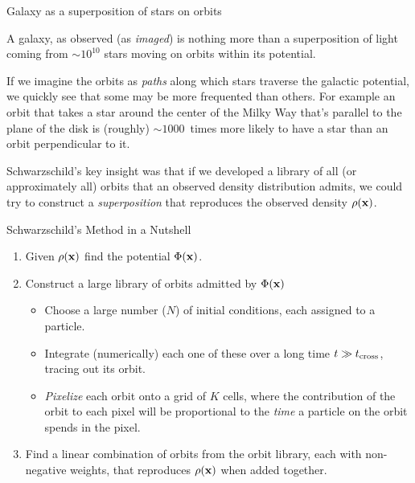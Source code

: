 \documentclass[letterpaper,landscape]{slides}
\begin{document}
\begin{slide}
\begin{center}
{\large \color{red} 
                  Galaxy as a superposition of stars on orbits  }
\end{center}

A galaxy, as observed (as {\em imaged}) is nothing more than a superposition
of light coming from $\sim 10^{10}$ stars moving on orbits within its
potential.

If we imagine the orbits as {\em paths} along which stars traverse the galactic 
potential, we quickly see that some may be more frequented than others.
For example an orbit that takes a star around the center
of the Milky Way that's parallel to the plane of the disk is (roughly) $\sim
1000$~times more likely to have a star than an orbit perpendicular to it.

Schwarzschild's key insight was that if we developed a {\rm library} of all
(or approximately all) orbits that an observed density distribution admits, we could
try to construct a {\em superposition} that reproduces the observed density
$\rho({\bf x})$.

\vfill
\end{slide}

\begin{slide}
\begin{center}
{\large \color{red} 
                  Schwarzschild's Method in a Nutshell }
\end{center}

\begin{enumerate}
\item Given $\rho({\bf x})$ find the potential $\Phi({\bf x})$.
\item Construct a large library of orbits admitted by $\Phi({\bf x})$
	\begin{itemize}
	\item Choose a large number ($N$) of initial conditions, each assigned to a particle.
	\item Integrate (numerically) each one of these over a long time $t \gg t_{\rm
	cross}$, tracing out its orbit.
	\item {\em Pixelize} each orbit onto a grid of $K$ cells, where the
		contribution of the orbit to each pixel will be proportional
		to the {\em time} a particle on the orbit spends in the pixel.
	\end{itemize}
\item Find a linear combination of orbits from the orbit library, each with
	non-negative weights, that reproduces $\rho({\bf x})$ when added
	together.
\end{enumerate}

\vfill
\end{slide}
\end{document}
